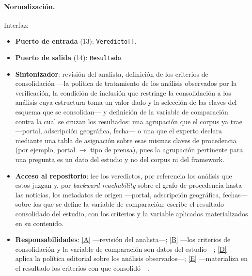 \documentclass[12pt]{report}
\DeclareRobustCommand{\resp}[1]{\hyperref[tab:registro-responsabilidades]{\textcolor{respcolor}{[#1]}}}
\begin{document}
\paragraph{Normalización.} Interfaz:
\begin{itemize}
  \item \textbf{Puerto de entrada} (13): \texttt{Veredicto[]}.
  \item \textbf{Puerto de salida} (14): \texttt{Resultado}.
  \item \textbf{Sintonizador}: revisión del analista, definición de los criterios de consolidación ---la política de tratamiento de los análisis observados por la verificación, la condición de inclusión que restringe la consolidación a los análisis cuya estructura toma un valor dado y la selección de las claves del esquema que se consolidan--- y definición de la variable de comparación contra la cual se cruzan los resultados: una agrupación que el corpus ya trae ---portal, adscripción geográfica, fecha--- o una que el experto declara mediante una tabla de asignación sobre esas mismas claves de procedencia (por ejemplo, portal \(\to\) tipo de prensa), pues la agrupación pertinente para una pregunta es un dato del estudio y no del corpus ni del framework.
  \item \textbf{Acceso al repositorio}: lee los veredictos, por referencia los análisis que estos juzgan y, por \textit{backward reachability} sobre el grafo de procedencia hasta las noticias, los metadatos de origen ---portal, adscripción geográfica, fechas--- sobre los que se define la variable de comparación; escribe el resultado consolidado del estudio, con los criterios y la variable aplicados materializados en su contenido.
  \item \textbf{Responsabilidades}: \resp{A} ---revisión del analista---; \resp{B} ---los criterios de consolidación y la variable de comparación son datos del estudio---; \resp{D} ---aplica la política editorial sobre los análisis observados---; \resp{E} ---materializa en el resultado los criterios con que consolidó---.
\end{itemize}
\end{document}
